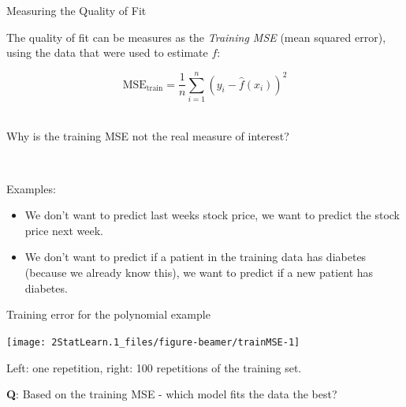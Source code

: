 \documentclass[
  ignorenonframetext,
]{beamer}
\begin{document}
\begin{frame}
\begin{block}{Measuring the Quality of Fit}
\protect\hypertarget{measuring-the-quality-of-fit}{}
\vspace{2mm}

The quality of fit can be measures as the \emph{Training MSE} (mean
squared error), using the data that were used to estimate \(f\):

\[ \text{MSE}_{\text{train}}=\frac{1}{n}\sum_{i=1}^n (y_i-\hat{f}(x_i))^2\]
\(~\)
\end{block}
\end{frame}

\begin{frame}
Why is the training MSE not the real measure of interest?

\(~\)

\pause

Examples:

\begin{itemize}
\item
  We don't want to predict last weeks stock price, we want to predict
  the stock price next week.
\item
  We don't want to predict if a patient in the training data has
  diabetes (because we already know this), we want to predict if a new
  patient has diabetes.
\end{itemize}
\end{frame}

\begin{frame}
\begin{block}{Training error for the polynomial example}
\protect\hypertarget{training-error-for-the-polynomial-example}{}
\(~\)

\begin{center}\texttt{[image: 2StatLearn.1\_files/figure-beamer/trainMSE-1]} \end{center}

\vspace{2mm}

Left: one repetition, right: 100 repetitions of the training set.

\vspace{2mm}

\textbf{Q}: Based on the training MSE - which model fits the data the
best?
\end{block}
\end{frame}
\end{document}
